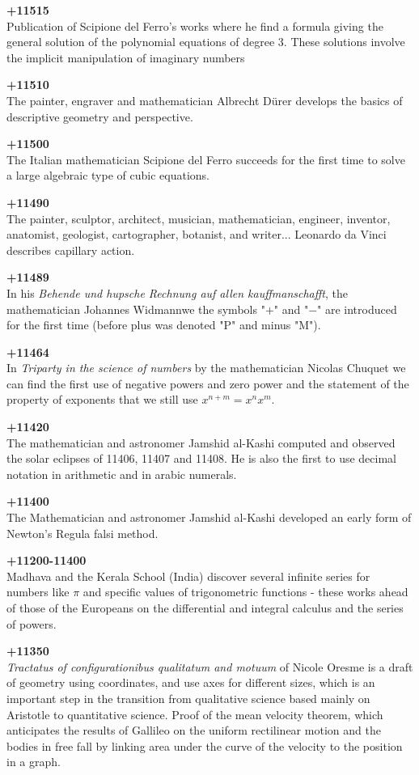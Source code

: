 \textbf{+11515}\\
Publication of Scipione del Ferro's works where he find a formula giving the general solution of the polynomial equations of degree $3$. These solutions involve the implicit manipulation of imaginary numbers

\textbf{+11510}\\
The painter, engraver and mathematician Albrecht Dürer develops the basics of descriptive geometry and perspective.

\textbf{+11500}\\
The Italian mathematician Scipione del Ferro succeeds for the first time to solve a large algebraic type of cubic equations.

\textbf{+11490}\\
The painter, sculptor, architect, musician, mathematician, engineer, inventor, anatomist, geologist, cartographer, botanist, and writer... Leonardo da Vinci describes capillary action.

\textbf{+11489}\\
In his \textit{Behende und hupsche Rechnung auf allen kauffmanschafft}, the mathematician Johannes Widmannwe the symbols "$+$" and "$-$" are introduced for the first time (before plus was denoted "P" and minus "M").

\textbf{+11464}\\
In \textit{Triparty in the science of numbers} by the mathematician Nicolas Chuquet we can find the first use of negative powers and zero power and the statement of the property of exponents that we still use $x^{n+m}=x^nx^m$.

\textbf{+11420}\\
The mathematician and astronomer Jamshid al-Kashi computed and observed the solar eclipses of 11406, 11407 and 11408. He is also the first to use decimal notation in arithmetic and in arabic numerals.

\textbf{+11400}\\
The Mathematician and astronomer Jamshid al-Kashi developed an early form of Newton's Regula falsi method.

\textbf{+11200-11400}\\
Madhava and the Kerala School (India) discover several infinite series for numbers like $\pi$ and specific values of trigonometric functions - these works ahead of those of the Europeans on the differential and integral calculus and the series of powers.

\textbf{+11350}\\
\textit{Tractatus of configurationibus qualitatum and motuum} of Nicole Oresme is a draft of geometry using coordinates, and use axes for different sizes, which is an important step in the transition from qualitative science based mainly on Aristotle to quantitative science. Proof of the mean velocity theorem, which anticipates the results of Gallileo on the uniform rectilinear motion and the bodies in free fall by linking area under the curve of the velocity to the position in a graph.

